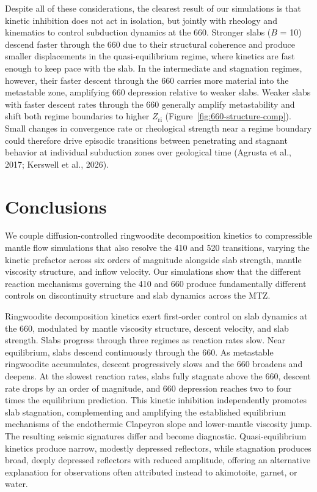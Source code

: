 \documentclass[draft,linenumbers]{agujournal2019}
\begin{document}
Despite all of these considerations, the clearest result of our
simulations is that kinetic inhibition does not act in isolation, but
jointly with rheology and kinematics to control subduction dynamics at
the 660. Stronger slabs (\(B\) = 10) descend faster through the 660 due
to their structural coherence and produce smaller displacements in the
quasi-equilibrium regime, where kinetics are fast enough to keep pace
with the slab. In the intermediate and stagnation regimes, however,
their faster descent through the 660 carries more material into the
metastable zone, amplifying 660 depression relative to weaker slabs.
Weaker slabs with faster descent rates through the 660 generally amplify
metastability and shift both regime boundaries to higher
\(Z_\mathrm{ri}\) (Figure~\ref{fig:660-structure-comp}). Small changes
in convergence rate or rheological strength near a regime boundary could
therefore drive episodic transitions between penetrating and stagnant
behavior at individual subduction zones over geological time ({Agrusta
et al.}, 2017; Kerswell et al., 2026).

\section{Conclusions}\label{sec:conclusions}

We couple diffusion-controlled ringwoodite decomposition kinetics to
compressible mantle flow simulations that also resolve the 410 and 520
transitions, varying the kinetic prefactor across six orders of
magnitude alongside slab strength, mantle viscosity structure, and
inflow velocity. Our simulations show that the different reaction
mechanisms governing the 410 and 660 produce fundamentally different
controls on discontinuity structure and slab dynamics across the MTZ.

Ringwoodite decomposition kinetics exert first-order control on slab
dynamics at the 660, modulated by mantle viscosity structure, descent
velocity, and slab strength. Slabs progress through three regimes as
reaction rates slow. Near equilibrium, slabs descend continuously
through the 660. As metastable ringwoodite accumulates, descent
progressively slows and the 660 broadens and deepens. At the slowest
reaction rates, slabs fully stagnate above the 660, descent rate drops
by an order of magnitude, and 660 depression reaches two to four times
the equilibrium prediction. This kinetic inhibition independently
promotes slab stagnation, complementing and amplifying the established
equilibrium mechanisms of the endothermic Clapeyron slope and
lower-mantle viscosity jump. The resulting seismic signatures differ and
become diagnostic. Quasi-equilibrium kinetics produce narrow, modestly
depressed reflectors, while stagnation produces broad, deeply depressed
reflectors with reduced amplitude, offering an alternative explanation
for observations often attributed instead to akimotoite, garnet, or
water.
\end{document}
